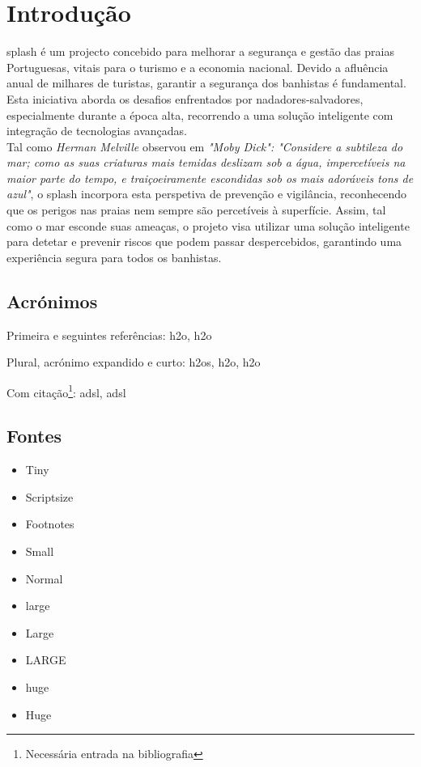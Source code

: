 \chapter{Introdução}%
\label{chapter:introduction}

\begin{introduction}
\ac{splash} é um projecto concebido para melhorar a segurança e gestão das praias Portuguesas, vitais para o turismo e a economia nacional. Devido a afluência anual de milhares de turistas, garantir a segurança dos banhistas é fundamental. Esta iniciativa aborda os desafios enfrentados por nadadores-salvadores, especialmente durante a época alta, recorrendo a uma solução inteligente com integração de tecnologias avançadas. \\
Tal como \textit{Herman Melville} observou em \textit{"Moby Dick": "Considere a subtileza do mar; como as suas criaturas mais temidas deslizam sob a água, impercetíveis na maior parte do tempo, e traiçoeiramente escondidas sob os mais adoráveis tons de azul"}, o \ac{splash} incorpora esta perspetiva de prevenção e vigilância, reconhecendo que os perigos nas praias nem sempre são percetíveis à superfície. Assim, tal como o mar esconde suas ameaças, o projeto visa utilizar uma solução inteligente para detetar e prevenir riscos que podem passar despercebidos, garantindo uma experiência segura para todos os banhistas.
\end{introduction}



\section{Acrónimos}

Primeira e seguintes referências: \ac{h2o}, \ac{h2o}

Plural, acrónimo expandido e curto: \acp{h2o}, \acl{h2o}, \acs{h2o}

Com citação\footnote{Necessária entrada na bibliografia}: \ac{adsl}, \ac{adsl}


\section{Fontes}

\begin{itemize}
\item{\tiny Tiny}
\item{\scriptsize Scriptsize}
\item{\footnotesize Footnotes}
\item{\small Small}
\item{\normalsize Normal}
\item{\large large}
\item{\Large Large}
\item{\LARGE LARGE}
\item{\huge huge}
\item{\Huge Huge}
\end{itemize}

